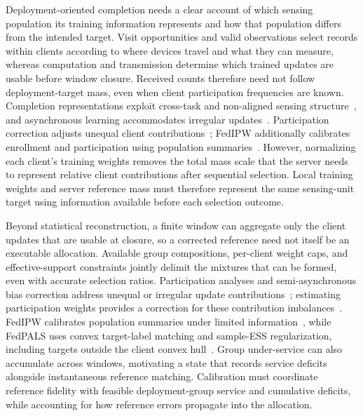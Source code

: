 \documentclass[letterpaper,journal]{IEEEtran}
\begin{document}
Deployment-oriented completion needs a clear account of which sensing population its training information represents and how that population differs from the intended target.
Visit opportunities and valid observations select records within clients according to where devices travel and what they can measure, whereas computation and transmission determine which trained updates are usable before window closure.
Received counts therefore need not follow deployment-target mass, even when client participation frequencies are known.
Completion representations exploit cross-task and non-aligned sensing structure~\cite{wang2024fewshot,liu2025nonaligned}, and asynchronous learning accommodates irregular updates~\cite{xie2019asynchronous}.
Participation correction adjusts unequal client contributions~\cite{wang2024lightweight,sun2025debiasing}; FedIPW additionally calibrates enrollment and participation using population summaries~\cite{morishita2026who}.
However, normalizing each client's training weights removes the total mass scale that the server needs to represent relative client contributions after sequential selection.
Local training weights and server reference mass must therefore represent the same sensing-unit target using information available before each selection outcome.

Beyond statistical reconstruction, a finite window can aggregate only the client updates that are usable at closure, so a corrected reference need not itself be an executable allocation.
Available group compositions, per-client weight caps, and effective-support constraints jointly delimit the mixtures that can be formed, even with accurate selection ratios.
Participation analyses and semi-asynchronous bias correction address unequal or irregular update contributions~\cite{wang2022unified,chen2026fedcure}; estimating participation weights provides a correction for these contribution imbalances~\cite{wang2024lightweight}.
FedIPW calibrates population summaries under limited information~\cite{morishita2026who}, while FedPALS uses convex target-label matching and sample-ESS regularization, including targets outside the client convex hull~\cite{listozec2024overcoming}.
Group under-service can also accumulate across windows, motivating a state that records service deficits alongside instantaneous reference matching.
Calibration must coordinate reference fidelity with feasible deployment-group service and cumulative deficits, while accounting for how reference errors propagate into the allocation.
\end{document}

